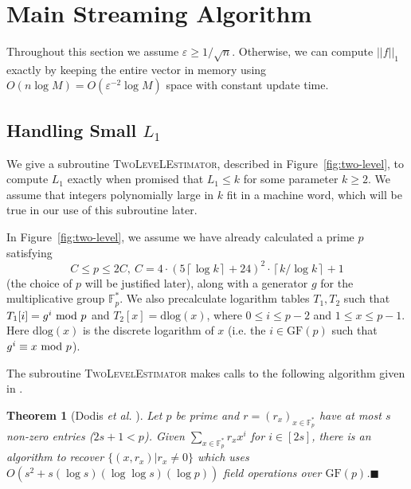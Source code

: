 \documentclass[letterpaper,11pt]{article}
\newcommand{\eps}{\varepsilon}
\newcommand{\ceil}[1]{\left\lceil #1 \right\rceil}
\newcommand{\GF}{\mathrm{GF}}
\newcommand{\dlog}{\mathrm{dlog}}
\renewcommand{\mod}{\hbox{ mod }}
\newcommand{\EquationName}[1]{\label{eq:#1}}
\newcommand{\SectionName}[1]{\label{sec:#1}}
\newcommand{\TheoremName}[1]{\label{thm:#1}}
\newcommand{\Figure}[1]{Figure~\ref{fig:#1}}
\newtheorem{theorem}{Theorem}\newtheorem{corollary}[theorem]{Corollary}
\newcommand{\proofbelow}{3pt}
\newcommand{\afterproof}{\hfill $\blacksquare$ \par \vspace{\proofbelow}}
\begin{document}
\section{Main Streaming Algorithm}\SectionName{body}
Throughout this section we assume $\eps\ge 1/\sqrt{n}$.  Otherwise, we
can compute $||f||_1$ exactly by keeping the entire vector in memory
using $O(n\log M) = O(\eps^{-2}\log M)$ space with constant update
time.

\subsection{Handling Small $L_1$}\SectionName{kset}
We give a subroutine \textsc{TwoLeveLEstimator}, described in
\Figure{two-level}, to
compute $L_1$ exactly when promised that $L_1\le k$ for some parameter
$k\ge 2$. We assume that integers polynomially large in $k$
fit in a machine word, which will be true in our use of this
subroutine later.

In \Figure{two-level}, we assume we have
already calculated a prime $p$ satisfying
\begin{equation}\EquationName{cdef}
C\le p\le 2C,\ C = 4\cdot (5\ceil{\log k} + 24)^2\cdot\ceil{k/\log k} + 1
\end{equation}
(the choice of $p$ will be justified later), along with a
generator $g$ for the multiplicative group $\mathbb{F}_p^*$.  We also
precalculate logarithm tables $T_1,T_2$ such that $T_1[i] = g^i\mod p$
and $T_2[x]
= \dlog(x)$, where $0\le i\le p-2$ and $1\le x\le p-1$. 
Here
$\dlog(x)$ is the discrete logarithm of $x$ (i.e. the $i\in \GF(p)$
such that $g^i \equiv x \mod p$).

The subroutine \textsc{TwoLevelEstimator} makes calls to the following
algorithm given in \cite{DORS08}.

\begin{theorem}[Dodis {\it et al.} {\cite[Lemma
    E.1]{DORS08}}]\TheoremName{dodis}
Let $p$ be prime and $r = (r_x)_{x\in\mathbb{F}_p^*}$ have at most $s$
non-zero
entries ($2s + 1 < p$). Given $\sum_{x\in\mathbb{F}_p^*} r_x x^i$
for $i\in[2s]$, there is an algorithm to recover
$\{(x,r_x)|r_x\neq 0\}$ which uses
$O(s^2 + s(\log s)(\log\log s)(\log p))$ field operations over
$\GF(p)$.\afterproof
\end{theorem}
\end{document}
